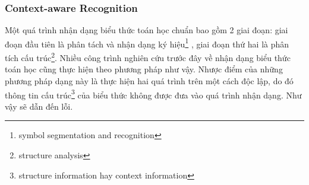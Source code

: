 \documentclass[a4paper,12pt]{article}
\begin{document}
%	
%	
%	
	
	\subsubsection{Context-aware Recognition\cite{context}}
	\label{subsec: context}
	Một quá trình nhận dạng biểu thức toán học chuẩn bao gồm 2 giai đoạn: giai đoạn đầu tiên là phân tách và nhận dạng ký hiệu\footnote{symbol segmentation and recognition} , giai đoạn thứ hai là phân tích cấu trúc\footnote{structure analysis}. Nhiều công trình nghiên cứu trước đây về nhận dạng biểu thức toán học cũng thực hiện theo phương pháp như vậy. Nhược điểm của những phương pháp dạng này là thực hiện hai quá trình trên một cách độc lập, do đó thông tin cấu trúc\footnote{structure information hay context information} của biểu thức không được đưa vào quá trình nhận dạng. Như vậy sẽ dẫn đến lỗi\cite{context}.
	
\end{document}
